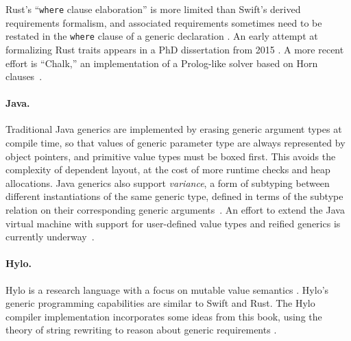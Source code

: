 \documentclass[../generics]{subfiles}
\begin{document}
Rust's ``\texttt{where} clause elaboration'' is more limited than Swift's derived requirements formalism, and associated requirements sometimes need to be restated in the \texttt{where} clause of a generic declaration \cite{rust_bug}. An early attempt at formalizing Rust traits appears in a PhD dissertation from 2015 \cite{Milewski_2015}. A more recent effort is ``Chalk,'' an implementation of a Prolog-like solver based on Horn clauses~\cite{rust_chalk}.

\paragraph{Java.}
Traditional Java generics are implemented by erasing generic argument types at compile time, so that values of generic parameter type are always represented by object pointers, and primitive value types must be boxed first. This avoids the complexity of dependent layout, at the cost of more runtime checks and heap allocations. Java generics also support \emph{variance}, a form of subtyping between different instantiations of the same generic type, defined in terms of the subtype relation on their corresponding generic arguments~\cite{java_faq}. An effort to extend the Java virtual machine with support for user-defined value types and reified generics is currently underway~\cite{valhalla}.

\paragraph{Hylo.}
 Hylo is a research language with a focus on mutable value semantics \cite{hylo}. Hylo's generic programming capabilities are similar to Swift and Rust. The Hylo compiler implementation incorporates some ideas from this book, using the theory of string rewriting to reason about generic requirements \cite{hylorqm}.
\end{document}
